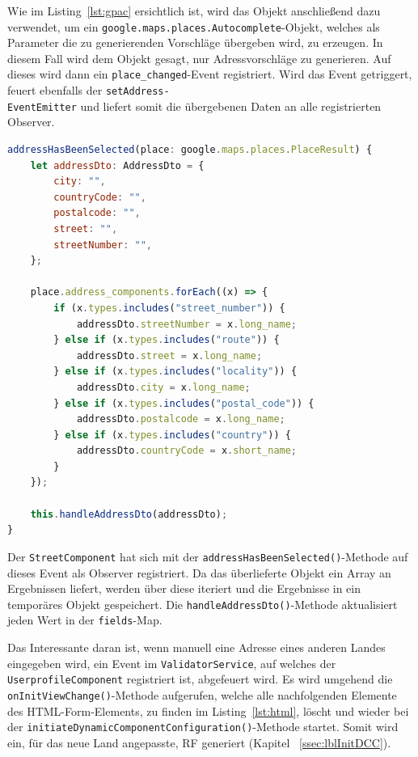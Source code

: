 Wie im Listing~\ref{lst:gpac} ersichtlich ist, wird das Objekt anschließend dazu verwendet, um ein \texttt{google.maps.places.Autocomplete}-Objekt, welches als Parameter die zu generierenden Vorschläge übergeben wird, zu erzeugen. In diesem Fall wird dem Objekt gesagt, nur Adressvorschläge zu generieren. Auf dieses wird dann ein \texttt{place\_changed}-Event registriert. Wird das Event getriggert, feuert ebenfalls der \texttt{setAddress-\\EventEmitter} und liefert somit die übergebenen Daten an alle registrierten Observer.

\begin{lstlisting}[caption={Die \texttt{addressHasBeenSelected()}-Methode der \texttt{StreetComponent}-Klasse}, language=JavaScript,label={lst:gpac}]
addressHasBeenSelected(place: google.maps.places.PlaceResult) {
	let addressDto: AddressDto = {
		city: "",
		countryCode: "",
		postalcode: "",
		street: "",
		streetNumber: "",
	};
	
	place.address_components.forEach((x) => {
		if (x.types.includes("street_number")) {
			addressDto.streetNumber = x.long_name;
		} else if (x.types.includes("route")) {
			addressDto.street = x.long_name;
		} else if (x.types.includes("locality")) {
			addressDto.city = x.long_name;
		} else if (x.types.includes("postal_code")) {
			addressDto.postalcode = x.long_name;
		} else if (x.types.includes("country")) {
			addressDto.countryCode = x.short_name;
		}
	});
	
	this.handleAddressDto(addressDto);
}
\end{lstlisting}

Der \texttt{StreetComponent} hat sich mit der \texttt{addressHasBeenSelected()}-Methode auf dieses Event als Observer registriert. Da das überlieferte Objekt ein Array an Ergebnissen liefert, werden über diese iteriert und die Ergebnisse in ein temporäres Objekt gespeichert. Die \texttt{handleAddressDto()}-Methode aktualisiert jeden Wert in der \texttt{fields}-Map. 

Das Interessante daran ist, wenn manuell eine Adresse eines anderen Landes eingegeben wird, ein Event im \texttt{ValidatorService}, auf welches der \texttt{UserprofileComponent} registriert ist, abgefeuert wird. Es wird umgehend die \texttt{onInitViewChange()}-Methode aufgerufen, welche alle nachfolgenden Elemente des HTML-Form-Elements, zu finden im Listing~\ref{lst:html}, löscht und wieder bei der \texttt{initiateDynamicComponentConfiguration()}-Methode startet. Somit wird ein, für das neue Land angepasste, RF generiert (Kapitel ~\ref{ssec:lblInitDCC}).


